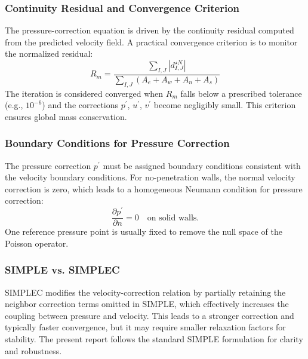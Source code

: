 \documentclass[12pt]{article}
\theoremstyle{plain}  %
\theoremstyle{definition}  %
\begin{document}
\subsubsection{Continuity Residual and Convergence Criterion}
\noindent The pressure-correction equation is driven by the continuity residual computed from the predicted velocity field. A practical convergence criterion is to monitor the normalized residual:
\begin{equation}
R_m = \frac{\sum_{I,J} \left| d_{I,J}^{\star N} \right|}{\sum_{I,J} \left( A_e + A_w + A_n + A_s \right)}
\end{equation}
\noindent The iteration is considered converged when $R_m$ falls below a prescribed tolerance (e.g., $10^{-6}$) and the corrections $p^{\prime}$, $u^{\prime}$, $v^{\prime}$ become negligibly small. This criterion ensures global mass conservation.

\subsubsection{Boundary Conditions for Pressure Correction}
\noindent The pressure correction $p^{\prime}$ must be assigned boundary conditions consistent with the velocity boundary conditions. For no-penetration walls, the normal velocity correction is zero, which leads to a homogeneous Neumann condition for pressure correction:
\begin{equation}
\frac{\partial p^{\prime}}{\partial n} = 0 \quad \text{on solid walls.}
\end{equation}
\noindent One reference pressure point is usually fixed to remove the null space of the Poisson operator.

\subsubsection{SIMPLE vs. SIMPLEC}
\noindent SIMPLEC modifies the velocity-correction relation by partially retaining the neighbor correction terms omitted in SIMPLE, which effectively increases the coupling between pressure and velocity. This leads to a stronger correction and typically faster convergence, but it may require smaller relaxation factors for stability. The present report follows the standard SIMPLE formulation for clarity and robustness.
\end{document}
